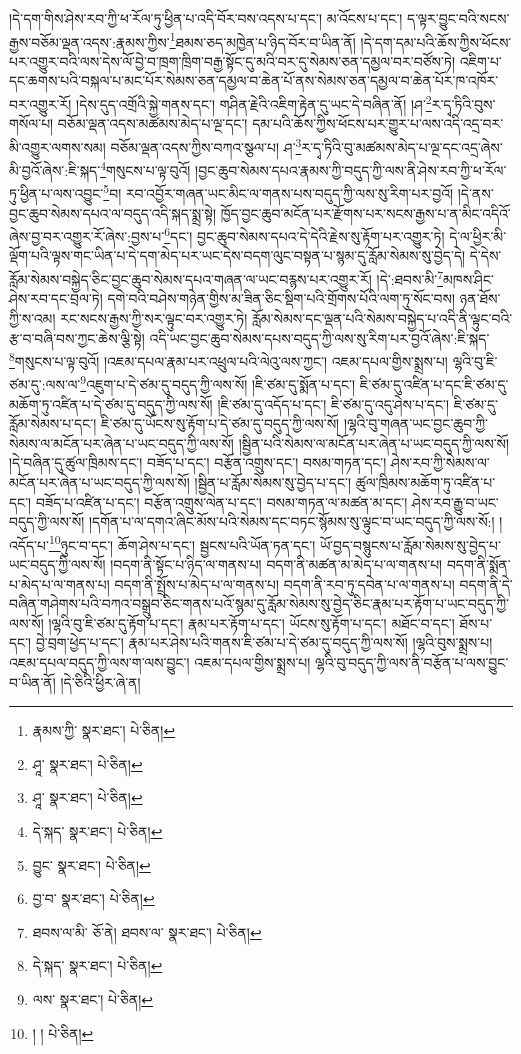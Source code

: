 །དེ་དག་གིས་ཤེས་རབ་ཀྱི་ཕ་རོལ་ཏུ་ཕྱིན་པ་འདི་བོར་བས་འདས་པ་དང་། མ་འོངས་པ་དང་། ད་ལྟར་བྱུང་བའི་སངས་རྒྱས་བཅོམ་ལྡན་འདས་:རྣམས་ཀྱིས་\footnote{རྣམས་ཀྱི་  སྣར་ཐང་།  པེ་ཅིན། }ཐམས་ཅད་མཁྱེན་པ་ཉིད་བོར་བ་ཡིན་ནོ། །དེ་དག་དམ་པའི་ཆོས་ཀྱིས་ཕོངས་པར་འགྱུར་བའི་ལས་དེས་ལོ་བྱེ་བ་ཁྲག་ཁྲིག་བརྒྱ་སྟོང་དུ་མའི་བར་དུ་སེམས་ཅན་དམྱལ་བར་བཙོས་ཏེ། འཇིག་པ་དང་ཆགས་པའི་བསྐལ་པ་མང་པོར་སེམས་ཅན་དམྱལ་བ་ཆེན་པོ་ནས་སེམས་ཅན་དམྱལ་བ་ཆེན་པོར་ཁ་འཁོར་བར་འགྱུར་རོ། །དེས་དུད་འགྲོའི་སྐྱེ་གནས་དང་། གཤིན་རྗེའི་འཇིག་རྟེན་དུ་ཡང་དེ་བཞིན་ནོ། །ཤ་\footnote{ཤཱ་  སྣར་ཐང་།  པེ་ཅིན། }ར་དྭ་ཏིའི་བུས་གསོལ་པ། བཅོམ་ལྡན་འདས་མཚམས་མེད་པ་ལྔ་དང་། དམ་པའི་ཆོས་ཀྱིས་ཕོངས་པར་གྱུར་པ་ལས་འདི་འདྲ་བར་མི་འགྱུར་ལགས་སམ། བཅོམ་ལྡན་འདས་ཀྱིས་བཀའ་སྩལ་པ། ཤ་\footnote{ཤཱ་  སྣར་ཐང་།  པེ་ཅིན། }ར་དྭ་ཏིའི་བུ་མཚམས་མེད་པ་ལྔ་དང་འདྲ་ཞེས་མི་བྱའོ་ཞེས་:ཇི་སྐད་\footnote{དེ་སྐད་  སྣར་ཐང་།  པེ་ཅིན། }གསུངས་པ་ལྟ་བུའོ། །བྱང་ཆུབ་སེམས་དཔའ་རྣམས་ཀྱི་བདུད་ཀྱི་ལས་ནི་ཤེས་རབ་ཀྱི་ཕ་རོལ་ཏུ་ཕྱིན་པ་ལས་འབྱུང་\footnote{བྱུང་  སྣར་ཐང་།  པེ་ཅིན། }བ། རབ་འབྱོར་གཞན་ཡང་མིང་ལ་གནས་པས་བདུད་ཀྱི་ལས་སུ་རིག་པར་བྱའོ། །དེ་ནས་བྱང་ཆུབ་སེམས་དཔའ་ལ་བདུད་འདི་སྐད་སྨྲ་སྟེ། ཁྱོད་བྱང་ཆུབ་མངོན་པར་རྫོགས་པར་སངས་རྒྱས་པ་ན་མིང་འདིའོ་ཞེས་བྱ་བར་འགྱུར་རོ་ཞེས་:བྱས་པ་\footnote{བྱ་བ་  སྣར་ཐང་།  པེ་ཅིན། }དང་། བྱང་ཆུབ་སེམས་དཔའ་དེ་དེའི་རྗེས་སུ་རྟོག་པར་འགྱུར་ཏེ། དེ་ལ་ཕྱིར་མི་ལྡོག་པའི་ལྟས་གང་ཡིན་པ་དེ་དག་མེད་པར་ཡང་དེས་བདག་ལུང་བསྟན་པ་སྙམ་དུ་རློམ་སེམས་སུ་བྱེད་དེ། དེ་དེས་རློམ་སེམས་བསྐྱེད་ཅིང་བྱང་ཆུབ་སེམས་དཔའ་གཞན་ལ་ཡང་བརྙས་པར་འགྱུར་རོ། །དེ་:ཐབས་མི་\footnote{ཐབས་ལ་མི་  ཅོ་ནེ། ཐབས་ལ་  སྣར་ཐང་།  པེ་ཅིན། }མཁས་ཤིང་ཤེས་རབ་དང་བྲལ་ཏེ། དགེ་བའི་བཤེས་གཉེན་གྱིས་མ་ཟིན་ཅིང་སྡིག་པའི་གྲོགས་པོའི་ལག་ཏུ་སོང་བས། ཉན་ཐོས་ཀྱི་ས་འམ། རང་སངས་རྒྱས་ཀྱི་སར་ལྟུང་བར་འགྱུར་ཏེ། རློམ་སེམས་དང་ལྡན་པའི་སེམས་བསྐྱེད་པ་འདི་ནི་ལྟུང་བའི་རྩ་བ་བཞི་བས་ཀྱང་ཆེས་ལྕི་སྟེ། འདི་ཡང་བྱང་ཆུབ་སེམས་དཔས་བདུད་ཀྱི་ལས་སུ་རིག་པར་བྱའོ་ཞེས་:ཇི་སྐད་\footnote{དེ་སྐད་  སྣར་ཐང་།  པེ་ཅིན། }གསུངས་པ་ལྟ་བུའོ། །འཇམ་དཔལ་རྣམ་པར་འཕྲུལ་པའི་ལེའུ་ལས་ཀྱང་། འཇམ་དཔལ་གྱིས་སྨྲས་པ། ལྷའི་བུ་ཇི་ཙམ་དུ་:ལས་ལ་\footnote{ལས་  སྣར་ཐང་།  པེ་ཅིན། }འཇུག་པ་དེ་ཙམ་དུ་བདུད་ཀྱི་ལས་སོ། །ཇི་ཙམ་དུ་སྨོན་པ་དང་། ཇི་ཙམ་དུ་འཛིན་པ་དང་ཇི་ཙམ་དུ་མཆོག་ཏུ་འཛིན་པ་དེ་ཙམ་དུ་བདུད་ཀྱི་ལས་སོ། །ཇི་ཙམ་དུ་འདོད་པ་དང་། ཇི་ཙམ་དུ་འདུ་ཤེས་པ་དང་། ཇི་ཙམ་དུ་རློམ་སེམས་པ་དང་། ཇི་ཙམ་དུ་ཡོངས་སུ་རྟོག་པ་དེ་ཙམ་དུ་བདུད་ཀྱི་ལས་སོ། །ལྷའི་བུ་གཞན་ཡང་བྱང་ཆུབ་ཀྱི་སེམས་ལ་མངོན་པར་ཞེན་པ་ཡང་བདུད་ཀྱི་ལས་སོ། །སྦྱིན་པའི་སེམས་ལ་མངོན་པར་ཞེན་པ་ཡང་བདུད་ཀྱི་ལས་སོ། །དེ་བཞིན་དུ་ཚུལ་ཁྲིམས་དང་། བཟོད་པ་དང་། བརྩོན་འགྲུས་དང་། བསམ་གཏན་དང་། ཤེས་རབ་ཀྱི་སེམས་ལ་མངོན་པར་ཞེན་པ་ཡང་བདུད་ཀྱི་ལས་སོ། །སྦྱིན་པ་རློམ་སེམས་སུ་བྱེད་པ་དང་། ཚུལ་ཁྲིམས་མཆོག་ཏུ་འཛིན་པ་དང་། བཟོད་པ་འཛིན་པ་དང་། བརྩོན་འགྲུས་ལེན་པ་དང་། བསམ་གཏན་ལ་མཚན་མ་དང་། ཤེས་རབ་རྒྱུ་བ་ཡང་བདུད་ཀྱི་ལས་སོ། །དགོན་པ་ལ་དགའ་ཞིང་མོས་པའི་སེམས་དང་བཏང་སྙོམས་སུ་ལྟུང་བ་ཡང་བདུད་ཀྱི་ལས་སོ:། །འདོད་པ་\footnote{། །  པེ་ཅིན། }ཉུང་བ་དང་། ཆོག་ཤེས་པ་དང་། སྦྱངས་པའི་ཡོན་ཏན་དང་། ཡོ་བྱད་བསྙུངས་པ་རློམ་སེམས་སུ་བྱེད་པ་ཡང་བདུད་ཀྱི་ལས་སོ། །བདག་ནི་སྟོང་པ་ཉིད་ལ་གནས་པ། བདག་ནི་མཚན་མ་མེད་པ་ལ་གནས་པ། བདག་ནི་སྨོན་པ་མེད་པ་ལ་གནས་པ། བདག་ནི་སྤྲོས་པ་མེད་པ་ལ་གནས་པ། བདག་ནི་རབ་ཏུ་དབེན་པ་ལ་གནས་པ། བདག་ནི་དེ་བཞིན་གཤེགས་པའི་བཀའ་བསྒྲུབ་ཅིང་གནས་པའོ་སྙམ་དུ་རློམ་སེམས་སུ་བྱེད་ཅིང་རྣམ་པར་རྟོག་པ་ཡང་བདུད་ཀྱི་ལས་སོ། །ལྷའི་བུ་ཇི་ཙམ་དུ་རྟོག་པ་དང་། རྣམ་པར་རྟོག་པ་དང་། ཡོངས་སུ་རྟོག་པ་དང་། མཐོང་བ་དང་། ཐོས་པ་དང་། བྱེ་བྲག་ཕྱེད་པ་དང་། རྣམ་པར་ཤེས་པའི་གནས་ཇི་ཙམ་པ་དེ་ཙམ་དུ་བདུད་ཀྱི་ལས་སོ། །ལྷའི་བུས་སྨྲས་པ། འཇམ་དཔལ་བདུད་ཀྱི་ལས་ག་ལས་བྱུང་། འཇམ་དཔལ་གྱིས་སྨྲས་པ། ལྷའི་བུ་བདུད་ཀྱི་ལས་ནི་བརྩོན་པ་ལས་བྱུང་བ་ཡིན་ནོ། །དེ་ཅིའི་ཕྱིར་ཞེ་ན། 